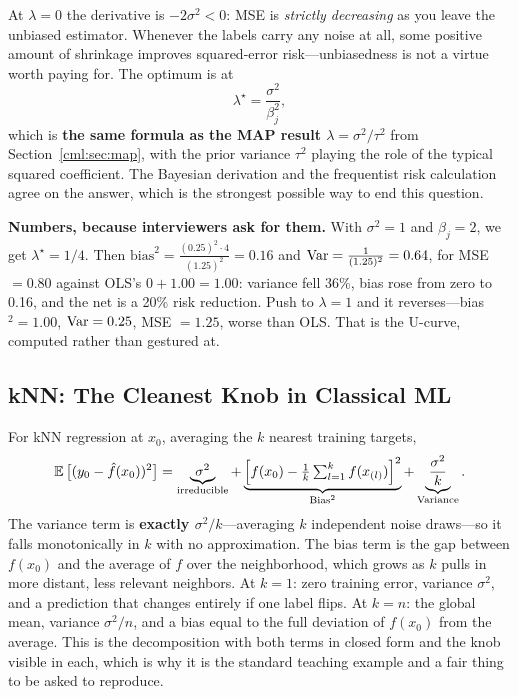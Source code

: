 \begin{keyinsight}
At $\lambda = 0$ the derivative is $-2\sigma^2 < 0$: MSE is \textit{strictly decreasing} as you leave the unbiased estimator. Whenever the labels carry any noise at all, some positive amount of shrinkage improves squared-error risk---unbiasedness is not a virtue worth paying for. The optimum is at
\begin{equation}
\lambda^\star = \frac{\sigma^2}{\beta_j^2},
\end{equation}
which is \textbf{the same formula as the MAP result $\lambda = \sigma^2/\tau^2$} from Section~\ref{cml:sec:map}, with the prior variance $\tau^2$ playing the role of the typical squared coefficient. The Bayesian derivation and the frequentist risk calculation agree on the answer, which is the strongest possible way to end this question.
\end{keyinsight}

\textbf{Numbers, because interviewers ask for them.} With $\sigma^2 = 1$ and $\beta_j = 2$, we get $\lambda^\star = 1/4$. Then $\text{bias}^2 = \frac{(0.25)^2 \cdot 4}{(1.25)^2} = 0.16$ and $\operatorname{Var} = \frac{1}{(1.25)^2} = 0.64$, for MSE $= 0.80$ against OLS's $0 + 1.00 = 1.00$: variance fell 36\%, bias rose from zero to 0.16, and the net is a 20\% risk reduction. Push to $\lambda = 1$ and it reverses---bias$^2 = 1.00$, $\operatorname{Var} = 0.25$, MSE $= 1.25$, worse than OLS. That is the U-curve, computed rather than gestured at.

\subsection{kNN: The Cleanest Knob in Classical ML}

For kNN regression at $x_0$, averaging the $k$ nearest training targets,
\begin{equation}
\operatorname{\mathbb{E}}\big[(y_0 - \hat f(x_0))^2\big] = \underbrace{\sigma^2}_{\text{irreducible}} + \underbrace{\Big[f(x_0) - \tfrac{1}{k}\textstyle\sum_{l=1}^{k} f(x_{(l)})\Big]^2}_{\text{Bias}^2} + \underbrace{\frac{\sigma^2}{k}}_{\text{Variance}} .
\end{equation}
The variance term is \textbf{exactly $\sigma^2/k$}---averaging $k$ independent noise draws---so it falls monotonically in $k$ with no approximation. The bias term is the gap between $f(x_0)$ and the average of $f$ over the neighborhood, which grows as $k$ pulls in more distant, less relevant neighbors. At $k=1$: zero training error, variance $\sigma^2$, and a prediction that changes entirely if one label flips. At $k=n$: the global mean, variance $\sigma^2/n$, and a bias equal to the full deviation of $f(x_0)$ from the average. This is the decomposition with both terms in closed form and the knob visible in each, which is why it is the standard teaching example and a fair thing to be asked to reproduce.

